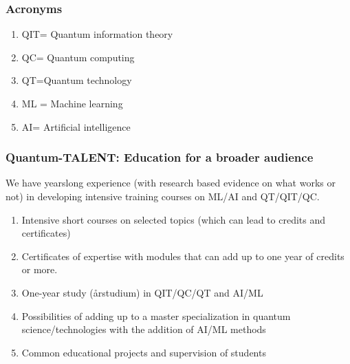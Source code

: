 \documentclass{beamer}
\begin{document}
\begin{frame}
\frametitle{Acronyms}


\begin{block}{}
\begin{enumerate}
\item QIT= Quantum information theory
\item QC= Quantum computing
\item QT=Quantum technology
\item ML = Machine learning
\item AI= Artificial intelligence
\end{enumerate}
\end{block}
\end{frame}



\begin{frame}
\frametitle{Quantum-TALENT: Education for a broader audience}

We have yearslong experience (with research based evidence on what works or not) in developing intensive training courses on ML/AI and QT/QIT/QC.

\begin{block}{}
\begin{enumerate}
\item Intensive short courses on selected topics (which can lead to credits and certificates)

\item Certificates of expertise with modules that can add up to one year of credits or more.

\item One-year study (\aa rstudium) in QIT/QC/QT and AI/ML


\item Possibilities of adding up to a master specialization in quantum science/technologies with the addition of AI/ML methods

\item Common educational projects and supervision of students
\end{enumerate}

\noindent
\end{block}
\end{frame}
\end{document}
